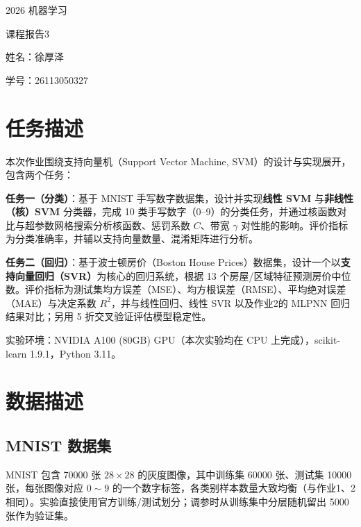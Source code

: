\documentclass[UTF8,zihao=-4]{ctexart}
\newcommand{\ReportCourse}{2026 机器学习}
\newcommand{\ReportNo}{3}
\newcommand{\ReportName}{徐厚泽}
\newcommand{\ReportStudentID}{26113050327}
\begin{document}
\begin{titlepage}
  \centering
  \vspace*{1.2cm}
  {\heiti{}\ReportCourse\par}
  \vspace{1.5em}
  {\heiti{}课程报告\ReportNo\par}
  \vfill
  {\kaishu{}姓名：\ReportName\par}
  \vspace{0.8em}
  {\kaishu{}学号：\ReportStudentID\par}
  \vfill
\end{titlepage}

\section{任务描述}
本次作业围绕支持向量机（Support Vector Machine, SVM）的设计与实现展开，包含两个任务：

\textbf{任务一（分类）}：基于 MNIST 手写数字数据集，设计并实现\textbf{线性 SVM} 与\textbf{非线性（核）SVM} 分类器，完成 10 类手写数字（0--9）的分类任务，并通过核函数对比与超参数网格搜索分析核函数、惩罚系数 $C$、带宽 $\gamma$ 对性能的影响。评价指标为分类准确率，并辅以支持向量数量、混淆矩阵进行分析。

\textbf{任务二（回归）}：基于波士顿房价（Boston House Prices）数据集，设计一个以\textbf{支持向量回归（SVR）}为核心的回归系统，根据 13 个房屋/区域特征预测房价中位数。评价指标为测试集均方误差（MSE）、均方根误差（RMSE）、平均绝对误差（MAE）与决定系数 $R^2$，并与线性回归、线性 SVR 以及作业2的 MLPNN 回归结果对比；另用 5 折交叉验证评估模型稳定性。

实验环境：NVIDIA A100 (80GB) GPU（本次实验均在 CPU 上完成），scikit-learn 1.9.1，Python 3.11。

\section{数据描述}
\subsection{MNIST 数据集}
MNIST 包含 70000 张 $28\times 28$ 的灰度图像，其中训练集 60000 张、测试集 10000 张，每张图像对应 $0\sim 9$ 的一个数字标签，各类别样本数量大致均衡（与作业1、2相同）。实验直接使用官方训练/测试划分；调参时从训练集中分层随机留出 5000 张作为验证集。
\end{document}
